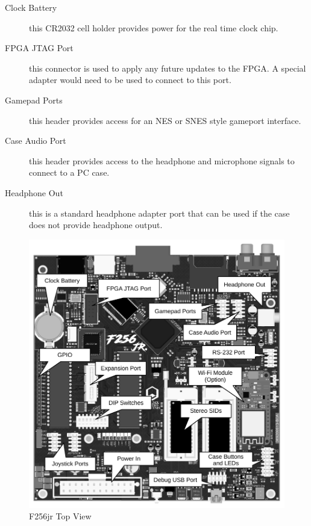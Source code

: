 \begin{description}
    \item[Clock Battery] this CR2032 cell holder provides power for the real time clock chip.

    \item[FPGA JTAG Port] this connector is used to apply any future updates to the FPGA. A special adapter would need to be used to connect to this port.

    \item[Gamepad Ports] this header provides access for an NES or SNES style gameport interface.

    \item[Case Audio Port] this header provides access to the headphone and microphone signals to connect to a PC case.

    \item[Headphone Out] this is a standard headphone adapter port that can be used if the case does not provide headphone output.
\end{description}

\begin{figure}[ht]
    \begin{center}
        \includegraphics[scale=0.75]{images/f256_render_annotated_top.pdf}
    \end{center}
    \caption{F256jr Top View}
    \label{fig:top}
\end{figure}

